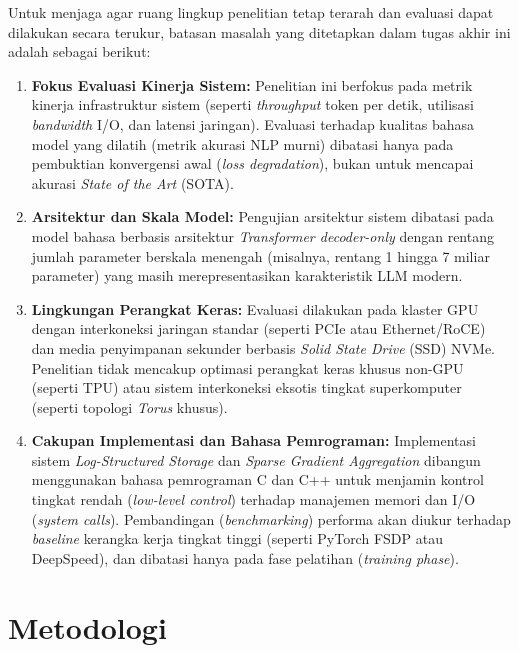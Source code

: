 Untuk menjaga agar ruang lingkup penelitian tetap terarah dan evaluasi dapat dilakukan secara terukur, batasan masalah yang ditetapkan dalam tugas akhir ini adalah sebagai berikut:
\begin{enumerate}
    \item \textbf{Fokus Evaluasi Kinerja Sistem:} Penelitian ini berfokus pada metrik kinerja infrastruktur sistem (seperti \emph{throughput} token per detik, utilisasi \emph{bandwidth} I/O, dan latensi jaringan). Evaluasi terhadap kualitas bahasa model yang dilatih (metrik akurasi NLP murni) dibatasi hanya pada pembuktian konvergensi awal (\emph{loss degradation}), bukan untuk mencapai akurasi \emph{State of the Art} (SOTA).
    \item \textbf{Arsitektur dan Skala Model:} Pengujian arsitektur sistem dibatasi pada model bahasa berbasis arsitektur \emph{Transformer decoder-only} dengan rentang jumlah parameter berskala menengah (misalnya, rentang 1 hingga 7 miliar parameter) yang masih merepresentasikan karakteristik LLM modern.
    \item \textbf{Lingkungan Perangkat Keras:} Evaluasi dilakukan pada klaster GPU dengan interkoneksi jaringan standar (seperti PCIe atau Ethernet/RoCE) dan media penyimpanan sekunder berbasis \emph{Solid State Drive} (SSD) NVMe. Penelitian tidak mencakup optimasi perangkat keras khusus non-GPU (seperti TPU) atau sistem interkoneksi eksotis tingkat superkomputer (seperti topologi \emph{Torus} khusus).
    \item \textbf{Cakupan Implementasi dan Bahasa Pemrograman:} Implementasi sistem \textit{Log-Structured Storage} dan \textit{Sparse Gradient Aggregation} dibangun menggunakan bahasa pemrograman C dan C++ untuk menjamin kontrol tingkat rendah (\textit{low-level control}) terhadap manajemen memori dan I/O (\textit{system calls}). Pembandingan (\emph{benchmarking}) performa akan diukur terhadap \textit{baseline} kerangka kerja tingkat tinggi (seperti PyTorch FSDP atau DeepSpeed), dan dibatasi hanya pada fase pelatihan (\emph{training phase}).
\end{enumerate}

\section{Metodologi}


